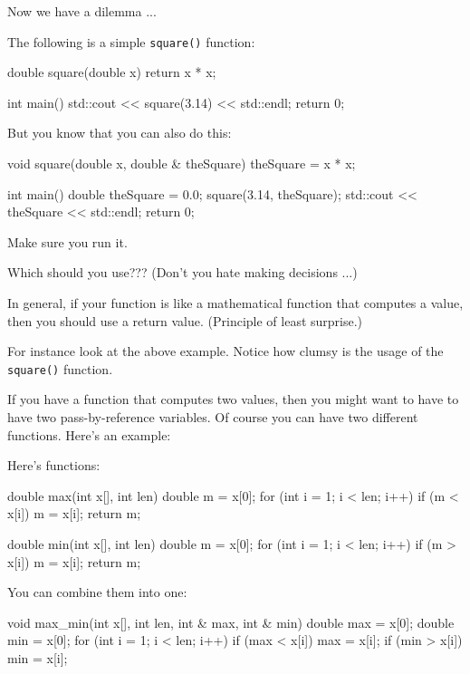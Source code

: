 \newpage{}

Now we have a dilemma ...

The following is a simple \texttt{square()} function:

\begin{consolethree}[escapeinside=||]
double square(double x)
{
    return x * x;
}

int main()
{
    std::cout << square(3.14) << std::endl;
    return 0;
}
\end{consolethree}

But you know that you can also do this:

\begin{consolethree}[escapeinside=||]
void square(double x, double & theSquare)
{
    theSquare = x * x;
}

int main()
{
    double theSquare = 0.0;
    square(3.14, theSquare);
    std::cout << theSquare << std::endl;
    return 0;
}
\end{consolethree}

Make sure you run it.

Which should you use??? (Don't you hate making decisions ...)

In general, if your function is like a mathematical function that computes a value, then you should use a return value. (Principle of least surprise.)

For instance look at the above example. Notice how clumsy is the usage of the \texttt{square()} function.

If you have a function that computes two values, then you might want to have to have two pass-by-reference variables. Of course you can have two different functions. Here's an example:

Here's functions:

\begin{consolethree}[escapeinside=||]
double max(int x[], int len)
{
    double m = x[0];
    for (int i = 1; i < len; i++)
    {
        if (m < x[i]) m = x[i];
    }
    return m;
}

double min(int x[], int len)
{
    double m = x[0];
    for (int i = 1; i < len; i++)
    {
        if (m > x[i]) m = x[i];
    }
    return m;
}
\end{consolethree}

You can combine them into one:

\begin{consolethree}[escapeinside=||]
void max_min(int x[], int len,
             int & max, int & min)
{
    double max = x[0];
    double min = x[0];
    for (int i = 1; i < len; i++)
    {
        if (max < x[i]) max = x[i];
        if (min > x[i]) min = x[i];
    }
}
\end{consolethree}

